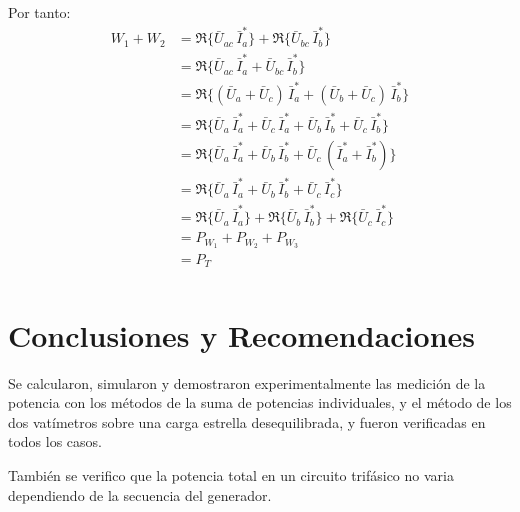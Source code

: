 \documentclass[letter,11pt]{article}
\begin{document}
\begin{enumerate}
Por tanto:
\begin{equation*}
    \begin{split}
        W_1 + W_2 &= \Re\{\bar{U}_{ac}\,\bar{I}_{a}^*\}+
                     \Re\{\bar{U}_{bc}\,\bar{I}_{b}^*\}\\
                  &= \Re\{\bar{U}_{ac}\,\bar{I}_{a}^*+
                          \bar{U}_{bc}\,\bar{I}_{b}^*\}\\
                  &= \Re\{(\bar{U}_a+\bar{U}_c)\,\bar{I}_a^*+
                          (\bar{U}_b+\bar{U}_c)\,\bar{I}_b^*\}\\
                  &= \Re\{\bar{U}_a\,\bar{I}_a^*+
                          \bar{U}_c\,\bar{I}_a^*+
                          \bar{U}_b\,\bar{I}_b^*+
                          \bar{U}_c\,\bar{I}_b^*\}\\
                  &= \Re\{\bar{U}_a\,\bar{I}_a^*+
                          \bar{U}_b\,\bar{I}_b^*+
                          \bar{U}_c\,(\bar{I}_a^*+\bar{I}_b^*)\}\\
                  &= \Re\{\bar{U}_a\,\bar{I}_a^*+
                          \bar{U}_b\,\bar{I}_b^*+
                          \bar{U}_c\,\bar{I}_c^*\}\\
                  &= \Re\{\bar{U}_a\,\bar{I}_a^*\}+
                     \Re\{\bar{U}_b\,\bar{I}_b^*\}+
                     \Re\{\bar{U}_c\,\bar{I}_c^*\}\\
                  &= P_{W_1} + P_{W_2} + P_{W_3}\\
                  &= P_T\\
    \end{split}
\end{equation*}

\end{enumerate}

\section{Conclusiones y Recomendaciones}
Se calcularon, simularon y demostraron experimentalmente las medición de la
potencia con los métodos de la suma de potencias individuales, y el método de
los dos vatímetros sobre una carga estrella desequilibrada, y fueron
verificadas en todos los casos.

También se verifico que la potencia total en un circuito trifásico no varia
dependiendo de la secuencia del generador.
\end{document}

